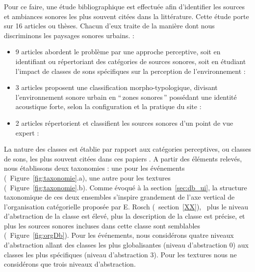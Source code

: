 Pour ce faire, une étude bibliographique est effectuée afin d'identifier les sources et ambiances sonores les plus souvent citées dans la littérature. Cette étude porte sur 16 articles ou thèses. Chacun d'eux traite de la manière dont nous discriminons les paysages sonores urbains.   :

\begin{itemize}
\item 9 articles abordent le problème par une approche perceptive, soit en identifiant ou répertoriant des catégories de sources sonores, soit en étudiant l'impact de classes de sons spécifiques sur la perception de l'environnement : \cite{maffiolo_caracterisation_1999,raimbault2002simulation,guastavino_etude_2003,defreville2004aactivity,raimbault2005urban,dubois2006cognitive,devergie_relations_2006,guastavino2006ideal,niessen2010categories}
\item 3 articles proposent une classification morpho-typologique, divisant l’environnement sonore urbain en ``\,zones sonores\,'' possédant une identité acoustique forte, selon la configuration et la pratique du site : \cite{maffiolo_caracterisation_1999,beaumont2004pertinence,polack2008perceptive}
\item 2 articles répertorient et classifient les sources sonores d’un point de vue expert : \cite{leobon_analyse_1986,brown2011towards}
\end{itemize}

La nature des classes est établie par rapport aux catégories perceptives, ou classes de sons, les plus souvent citées dans ces papiers . A  partir des éléments relevés, nous établissons deux taxonomies : une pour les événements (\cf~Figure~\ref{fig:taxonomie}.a), une autre pour les textures (\cf~Figure~\ref{fig:taxonomie}.b). Comme évoqué à la section~\ref{sec:db_ui}, la structure taxonomique de ces deux ensembles s'inspire grandement de l'axe vertical de l'organisation catégorielle  proposée  par E. Rosch (\Cf~section~\ref{XX}), \ie~plus le niveau d'abstraction de la classe est élevé, plus la description de la classe est précise, et plus les sources sonores incluses dans cette classe sont semblables (\Cf~Figure~\ref{fig:orgDb}). Pour les événements, nous considérons quatre niveaux d'abstraction allant des classes les plus globalisantes (niveau d'abstraction 0) aux classes les plus spécifiques (niveau d'abstraction 3). Pour les textures nous ne considérons que trois niveaux d'abstraction.

